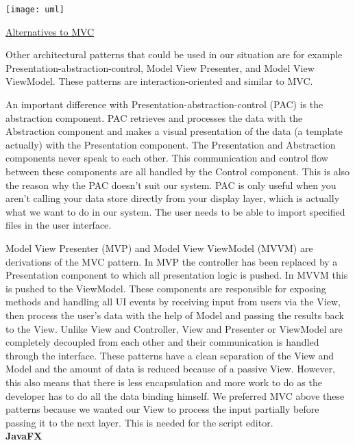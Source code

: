 \documentclass[a4paper,english,fleqn]{exam}
\begin{document}
\texttt{[image: uml]}

\newpage



\underline{Alternatives to MVC}

Other architectural patterns that could be used in our situation are for example Presentation-abstraction-control, Model View Presenter, and Model View ViewModel. These patterns are interaction-oriented and similar to MVC.
 
An important difference with Presentation-abstraction-control (PAC) is the abstraction component. PAC retrieves and processes the data with the Abstraction component and makes a visual presentation of the data (a template actually) with the Presentation component. The Presentation and Abstraction components never speak to each other. This communication and control flow between these components are all handled by the Control component. This is also the reason why the PAC doesn't suit our system. PAC is only useful when you aren't calling your data store directly from your display layer, which is actually what we want to do in our system. The user needs to be able to import specified files in the user interface.
 
Model View Presenter (MVP) and Model View ViewModel (MVVM) are derivations of the MVC pattern. In MVP the controller has been replaced by a Presentation component to which all presentation logic is pushed. In MVVM this is pushed to the ViewModel. These components are responsible for exposing methods and handling all UI events by receiving input from users via the View, then process the user's data with the help of Model and passing the results back to the View. Unlike View and Controller, View and Presenter or ViewModel are completely decoupled from each other and their communication is handled through the interface. These patterns have a clean separation of the View and Model and the amount of data is reduced because of a passive View. However, this also means that there is less encapsulation and more work to do as the developer has to do all the data binding himself. We preferred MVC above these patterns because we wanted our View to process the input partially before passing it to the next layer. This is needed for the script editor.
\\

\textbf{JavaFX} 
\end{document}
